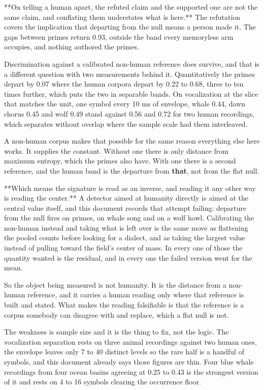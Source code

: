 **On telling a human apart, the refuted claim and the supported one are not the same claim, and conflating them understates what is here.** The refutation covers the implication that departing from the null means a person made it. The gaps between primes return 0.93, outside the band every memoryless arm occupies, and nothing authored the primes.

Discrimination against a calibrated non-human reference does survive, and that is a different question with two measurements behind it. Quantitatively the primes depart by 0.07 where the human corpora depart by 0.22 to 0.68, three to ten times further, which puts the two in separable bands. On vocalization at the slice that matches the unit, one symbol every 10 ms of envelope, whale 0.44, dawn chorus 0.45 and wolf 0.49 stand against 0.56 and 0.72 for two human recordings, which separates without overlap where the sample scale had them interleaved.

A non-human corpus makes that possible for the same reason everything else here works. It supplies the constant. Without one there is only distance from maximum entropy, which the primes also have. With one there is a second reference, and the human band is the departure from \textbf{that}, not from the flat null.

**Which means the signature is read as an inverse, and reading it any other way is reading the center.** A detector aimed at humanity directly is aimed at the central value itself, and this document records that attempt failing: departure from the null fires on primes, on whale song and on a wolf howl. Calibrating the non-human instead and taking what is left over is the same move as flattening the pooled counts before looking for a dialect, and as taking the largest value instead of pulling toward the field's center of mass. In every one of those the quantity wanted is the residual, and in every one the failed version went for the mean.

So the object being measured is not humanity. It is the distance from a non-human reference, and it carries a human reading only where that reference is built and stated. What makes the reading falsifiable is that the reference is a corpus somebody can disagree with and replace, which a flat null is not.

The weakness is sample size and it is the thing to fix, not the logic. The vocalization separation rests on three animal recordings against two human ones, the envelope leaves only 7 to 40 distinct levels so the rare half is a handful of symbols, and this document already says those figures are thin. Four blue whale recordings from four ocean basins agreeing at 0.25 to 0.43 is the strongest version of it and rests on 4 to 16 symbols clearing the occurrence floor.

